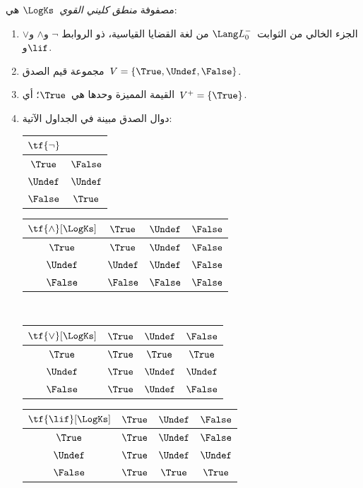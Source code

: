\documentclass[../../../include/open-logic-section]{subfiles}
\begin{document}
\begin{defn}
مصفوفة \emph{منطق كليني القوي}~$\LogKs$ هي:
\begin{enumerate}
  \item الجزء الخالي من الثوابت~$\Lang L_0^{-}$ من لغة القضايا القياسية، ذو الروابط
  $\lnot$ و$\land$ و$\lor$ و$\lif$.
  \item مجموعة قيم الصدق~$V = \{\True, \Undef, \False\}$.
  \item القيمة المميزة وحدها هي~$\True$؛ أي~$V^+ = \{\True\}$.
  \item دوال الصدق مبينة في الجداول الآتية:
  \begin{center}
    \begin{tabular}{c|c}
      $\tf{\lnot}$ & \\
      \hline
      $\True$ & $\False$ \\
      $\Undef$ & $\Undef$ \\
      $\False$ & $\True$
    \end{tabular}
    \quad
    \begin{tabular}{c|ccc}
      $\tf{\land}[\LogKs]$ & $\True$ & $\Undef$ & $\False$ \\
      \hline
      $\True$ & $\True$ & $\Undef$ & $\False$ \\
      $\Undef$ & $\Undef$ & $\Undef$ & $\False$\\
      $\False$ & $\False$ & $\False$ & $\False$
    \end{tabular}
    \\[2ex]
    \begin{tabular}{c|ccc}
      $\tf{\lor}[\LogKs]$ & $\True$ & $\Undef$ & $\False$ \\
      \hline
      $\True$ & $\True$ & $\True$ & $\True$ \\
      $\Undef$ & $\True$ & $\Undef$ & $\Undef$ \\
      $\False$ & $\True$ & $\Undef$ & $\False$
    \end{tabular}
    \quad
    \begin{tabular}{c|ccc}
      $\tf{\lif}[\LogKs]$ & $\True$ & $\Undef$ & $\False$ \\
      \hline
      $\True$ & $\True$ & $\Undef$ & $\False$ \\
      $\Undef$ & $\True$ & $\Undef$ & $\Undef$  \\
      $\False$ & $\True$ & $\True$ & $\True$
    \end{tabular}
  \end{center}
\end{enumerate}
\end{defn}
\end{document}
